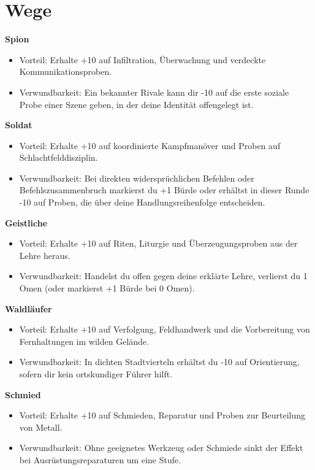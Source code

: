 \section{Wege}\label{sec:wege}
\noindent\textbf{Spion}\par
\begin{itemize}[leftmargin=*,nosep]
\item Vorteil: Erhalte +10 auf Infiltration, Überwachung und verdeckte Kommunikationsproben.
\item Verwundbarkeit: Ein bekannter Rivale kann dir -10 auf die erste soziale Probe einer Szene geben, in der deine Identität offengelegt ist.
\end{itemize}
\noindent\textbf{Soldat}\par
\begin{itemize}[leftmargin=*,nosep]
\item Vorteil: Erhalte +10 auf koordinierte Kampfmanöver und Proben auf Schlachtfelddisziplin.
\item Verwundbarkeit: Bei direkten widersprüchlichen Befehlen oder Befehlszusammenbruch markierst du +1 Bürde oder erhältst in dieser Runde -10 auf Proben, die über deine Handlungsreihenfolge entscheiden.
\end{itemize}
\noindent\textbf{Geistliche}\par
\begin{itemize}[leftmargin=*,nosep]
\item Vorteil: Erhalte +10 auf Riten, Liturgie und Überzeugungsproben aus der Lehre heraus.
\item Verwundbarkeit: Handelst du offen gegen deine erklärte Lehre, verlierst du 1 Omen (oder markierst +1 Bürde bei 0 Omen).
\end{itemize}
\noindent\textbf{Waldläufer}\par
\begin{itemize}[leftmargin=*,nosep]
\item Vorteil: Erhalte +10 auf Verfolgung, Feldhandwerk und die Vorbereitung von Fernhaltungen im wilden Gelände.
\item Verwundbarkeit: In dichten Stadtvierteln erhältst du -10 auf Orientierung, sofern dir kein ortskundiger Führer hilft.
\end{itemize}
\noindent\textbf{Schmied}\par
\begin{itemize}[leftmargin=*,nosep]
\item Vorteil: Erhalte +10 auf Schmieden, Reparatur und Proben zur Beurteilung von Metall.
\item Verwundbarkeit: Ohne geeignetes Werkzeug oder Schmiede sinkt der Effekt bei Ausrüstungsreparaturen um eine Stufe.
\end{itemize}
